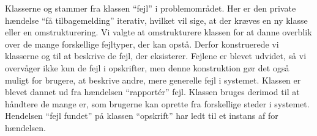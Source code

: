 Klasserne  og  stammer fra klassen ``fejl'' i problemområdet. Her er den private hændelse ``få tilbagemelding'' iterativ, hvilket vil sige, at der kræves en ny klasse eller en omstrukturering. Vi valgte at omstrukturere klassen for at danne overblik over de mange forskellige fejltyper, der kan opstå. Derfor konstruerede vi klasserne  og  til at beskrive de fejl, der eksisterer. Fejlene er blevet udvidet, så vi overvåger ikke kun de fejl i opskrifter, men denne konstruktion gør det også muligt for brugere, at beskrive andre, mere generelle fejl i systemet. Klassen  er blevet dannet ud fra hændelsen ``rapport\'{e}r'' fejl. Klassen  bruges derimod til at håndtere de mange er, som brugerne kan oprette fra forskellige steder i systemet. Hendelsen ``fejl fundet'' på klassen ``opskrift'' har \fx ledt til et instans af  for hændelsen.